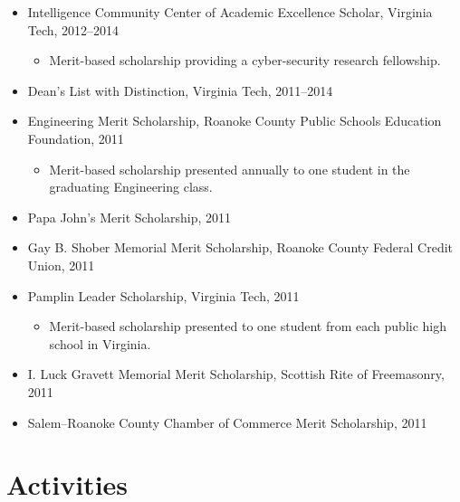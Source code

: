 \documentclass[11pt,letter,sans]{moderncv}
\begin{document}
\begin{itemize}
  
    \item Intelligence Community Center of Academic Excellence Scholar, Virginia Tech, 2012--2014
    
      \begin{itemize}
      \item {Merit-based scholarship providing a cyber-security research fellowship.}
      \end{itemize}
    
  
    \item Dean's List with Distinction, Virginia Tech, 2011--2014
    
  
    \item Engineering Merit Scholarship, Roanoke County Public Schools Education Foundation, 2011
    
      \begin{itemize}
      \item {Merit-based scholarship presented annually to one student in the graduating Engineering class.}
      \end{itemize}
    
  
    \item Papa John's Merit Scholarship, 2011
    
  
    \item Gay B. Shober Memorial Merit Scholarship, Roanoke County Federal Credit Union, 2011
    
  
    \item Pamplin Leader Scholarship, Virginia Tech, 2011
    
      \begin{itemize}
      \item {Merit-based scholarship presented to one student from each public high school in Virginia.}
      \end{itemize}
    
  
    \item I. Luck Gravett Memorial Merit Scholarship, Scottish Rite of Freemasonry, 2011
    
  
    \item Salem--Roanoke County Chamber of Commerce Merit Scholarship, 2011
    
  
  \end{itemize}
\section{ Activities }
\end{document}

